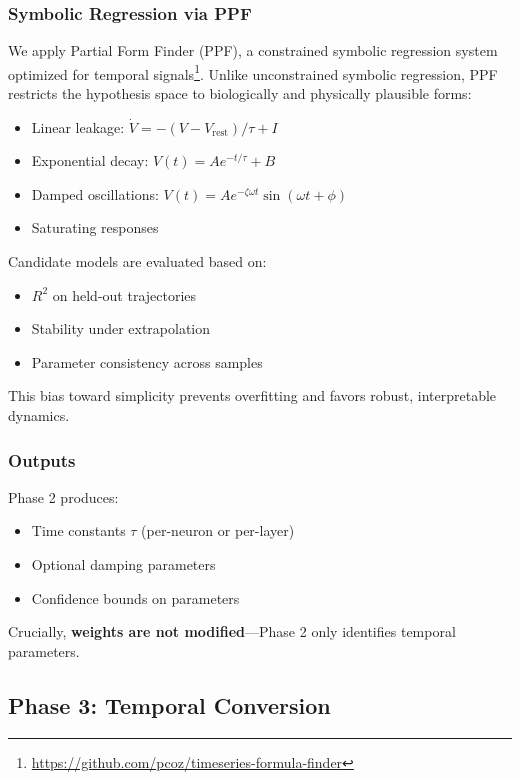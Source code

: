 \documentclass[11pt]{article}
\begin{document}
\subsubsection{Symbolic Regression via PPF}

We apply Partial Form Finder (PPF), a constrained symbolic regression system optimized for temporal signals\footnote{\url{https://github.com/pcoz/timeseries-formula-finder}}. Unlike unconstrained symbolic regression, PPF restricts the hypothesis space to biologically and physically plausible forms:

\begin{itemize}
    \item Linear leakage: $\dot{V} = -(V - V_{\text{rest}})/\tau + I$
    \item Exponential decay: $V(t) = A e^{-t/\tau} + B$
    \item Damped oscillations: $V(t) = A e^{-\zeta\omega t} \sin(\omega t + \phi)$
    \item Saturating responses
\end{itemize}

Candidate models are evaluated based on:
\begin{itemize}
    \item $R^2$ on held-out trajectories
    \item Stability under extrapolation
    \item Parameter consistency across samples
\end{itemize}

This bias toward simplicity prevents overfitting and favors robust, interpretable dynamics.

\subsubsection{Outputs}

Phase 2 produces:
\begin{itemize}
    \item Time constants $\tau$ (per-neuron or per-layer)
    \item Optional damping parameters
    \item Confidence bounds on parameters
\end{itemize}

Crucially, \textbf{weights are not modified}---Phase 2 only identifies temporal parameters.

\subsection{Phase 3: Temporal Conversion}
\end{document}
